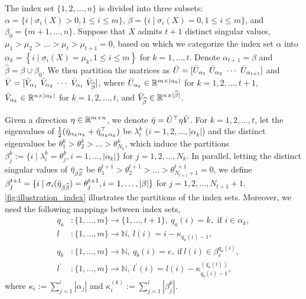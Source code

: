 The index set $\{1,2,\ldots,n\}$ is divided into three subsets: $\alpha =\{i \mid \sigma_i(X)>0,1 \leq i \leq m\}$, $\beta =\{i \mid \sigma_i(X)=0,1 \leq i \leq m\}$, and $\beta_0 =\{m+1, \ldots, n\}$. Suppose that $X$ admits $t+1$ distinct singular values, $\mu_1>\mu_2>\ldots>\mu_t>\mu_{t+1}=0$, based on which we categorize the index set $\alpha$ into $\alpha_k=\left\{i\mid \sigma_i(X)=\mu_k, 1 \leq i \leq m\right\}$ for $k=1, \ldots, t$. Denote $\alpha_{t+1}=\beta$ and $\widehat{\beta}=\beta\cup\beta_0$. We then partition the matrices as $\bU=[\bU_{\alpha_1}\ \bU_{\alpha_2}\ \cdots\ \bU_{\alpha_{t+1}}]$ and $\bV=[\bV_{\alpha_1}\ \bV_{\alpha_2}\ \cdots\ \bV_{\alpha_t}\ \bV_{\widehat{\beta}}]$, where $\bar{U}_{\alpha_k}\in\mathbb{R}^{m\times|\alpha_k|}$ for $k=1,2,\ldots,t+1$, $\bar{V}_{\alpha_k}\in\mathbb{R}^{n\times|\alpha_k|}$ for $k=1,2,\ldots,t$, and $\bar{V}_{\widehat{\beta}}\in\mathbb{R}^{n\times|\widehat{\beta}|}$.

Given a direction $\eta\in\mathbb{R}^{m\times n}$, we denote $\bar{\eta}=\bar{U}^\top\eta\bar{V}$. For $k=1,2,\ldots,t$, let the eigenvalues of $\frac{1}{2}(\bar{\eta}_{\alpha_k \alpha_k}+\bar{\eta}_{\alpha_k \alpha_k}^\top)$ be $\lambda_i^k$ ($i=1,2,\ldots,|\alpha_k|$) and the distinct eigenvalues be $\theta_1^k>\theta_2^k>\ldots>\theta_{N_k}^k$, which induce the partitions $\beta_j^k:=\{i\mid \lambda_i^k=\theta_j^k, i=1, \ldots,|\alpha_k|\}$ for $j=1,2,\ldots,N_k$. In parallel, letting the distinct singular values of $\bar{\eta}_{\beta \widehat{\beta}}$ be $\theta_1^{t+1}>\theta_2^{t+1}>\ldots>\theta_{N_{t+1}+1}^{t+1}=0$, we define $\beta_j^{t+1}=\{i\mid\sigma_i(\bar{\eta}_{\beta \widehat{\beta}})=\theta_j^{t+1}, i=1, \ldots,|\beta|\}$ for $j=1,2,\ldots,N_{t+1}+1$. \myfig\ref{fig:illustration_index} illustrates the partitions of the index sets. Moreover, we need the following mappings between index sets,
\begin{equation}\label{eq:indexmappings}
\begin{aligned}
q_a &:\{1, \ldots, m\} \rightarrow\{1, \ldots, t+1\},\ q_a(i)=k, \text { if } i \in \alpha_k, \\
l &:\{1, \ldots, m\} \rightarrow \mathbb{N},\ l(i)=i-\kappa_{q_a(i)-1}, \\
q_b &:\{1, \ldots, m\} \rightarrow \mathbb{N},\ q_b(i)=e,\ \text{if}\ l(i) \in \beta_e^{q_a(i)},\\
l^{\prime} &:\{1, \ldots, m\} \rightarrow \mathbb{N},\ l^{\prime}(i)=l(i)-\kappa_{q_b(i)-1}^{(q_a(i))},
\end{aligned}  
\end{equation}
where $\kappa_i:=\sum_{j=1}^i|\alpha_j|$ and $\kappa_i^{(k)}:=\sum_{j=1}^i|\beta_j^k|$.

